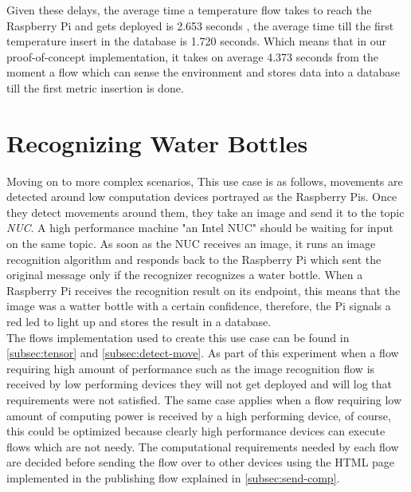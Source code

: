 \noindent Given these delays, the average time a temperature flow takes to reach the Raspberry Pi and gets deployed is 2.653 seconds , the average time till the first temperature insert in the database    is 1.720 seconds. Which means that in our proof-of-concept implementation, it takes on average 4.373 seconds from the moment a flow  which can sense the environment and stores data into a database till the first metric insertion is done.


\section{Recognizing Water Bottles } \label{sec:rwb}


Moving on to more complex scenarios, This use case  is as follows, movements are detected around low computation devices portrayed as the Raspberry Pis. Once they detect movements around them, they take an image and send it to the topic \textit{NUC}. A high performance machine "an Intel NUC" should be waiting for input on the same topic. As soon as the NUC  receives an image, it runs an image recognition algorithm and responds back to the Raspberry Pi which sent the original message  only if the recognizer recognizes a water bottle. When a Raspberry Pi receives the recognition result on its endpoint, this means that the image was a watter bottle with a certain confidence, therefore, the Pi signals a red led to light up and stores the result in a database. \\ 

\noindent The flows implementation used to create this use case can be found in \ref{subsec:tensor} and \ref{subsec:detect-move}.  As part of this experiment when a flow requiring high amount of performance such as the image recognition flow is received by low performing devices they will not get deployed and  will log that requirements were not satisfied. The same case applies when a flow requiring low amount of computing power is received by a high performing device, of course, this could be optimized because clearly high performance devices can execute flows which are not needy. The computational requirements needed by each flow are decided before sending the flow over to other devices using the HTML page implemented in the publishing flow explained in \ref{subsec:send-comp}.\\ 

